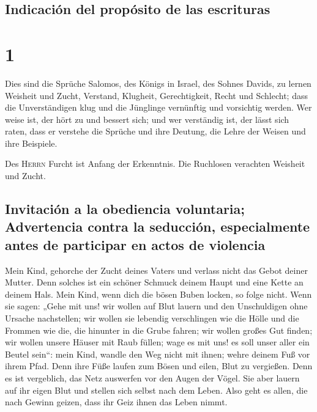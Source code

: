 \hypertarget{indicaciuxf3n-del-propuxf3sito-de-las-escrituras}{%
\subsection{Indicación del propósito de las
escrituras}\label{indicaciuxf3n-del-propuxf3sito-de-las-escrituras}}

\hypertarget{section}{%
\section{1}\label{section}}

 Dies sind die Sprüche Salomos, des Königs in Israel, des
Sohnes Davids,  zu lernen Weisheit und Zucht, Verstand,
 Klugheit, Gerechtigkeit, Recht und Schlecht;
 dass die Unverständigen klug und die Jünglinge vernünftig
und vorsichtig werden.  Wer weise ist, der hört zu und
bessert sich; und wer verständig ist, der lässt sich raten,
 dass er verstehe die Sprüche und ihre Deutung, die Lehre
der Weisen und ihre Beispiele.

 Des \textsc{Herrn} Furcht ist Anfang der Erkenntnis. Die
Ruchlosen verachten Weisheit und Zucht.

\hypertarget{invitaciuxf3n-a-la-obediencia-voluntaria-advertencia-contra-la-seducciuxf3n-especialmente-antes-de-participar-en-actos-de-violencia}{%
\subsection{Invitación a la obediencia voluntaria; Advertencia contra la
seducción, especialmente antes de participar en actos de
violencia}\label{invitaciuxf3n-a-la-obediencia-voluntaria-advertencia-contra-la-seducciuxf3n-especialmente-antes-de-participar-en-actos-de-violencia}}

 Mein Kind, gehorche der Zucht deines Vaters und verlass
nicht das Gebot deiner Mutter.  Denn solches ist ein
schöner Schmuck deinem Haupt und eine Kette an deinem Hals.
 Mein Kind, wenn dich die bösen Buben locken, so folge
nicht.  Wenn sie sagen: „Gehe mit uns! wir wollen auf
Blut lauern und den Unschuldigen ohne Ursache nachstellen;
 wir wollen sie lebendig verschlingen wie die Hölle und
die Frommen wie die, die hinunter in die Grube fahren; 
wir wollen großes Gut finden; wir wollen unsere Häuser mit Raub füllen;
 wage es mit uns! es soll unser aller ein Beutel sein``:
 mein Kind, wandle den Weg nicht mit ihnen; wehre deinem
Fuß vor ihrem Pfad.  Denn ihre Füße laufen zum Bösen und
eilen, Blut zu vergießen.  Denn es ist vergeblich, das
Netz auswerfen vor den Augen der Vögel.  Sie aber lauern
auf ihr eigen Blut und stellen sich selbst nach dem Leben.
 Also geht es allen, die nach Gewinn geizen, dass ihr
Geiz ihnen das Leben nimmt.

